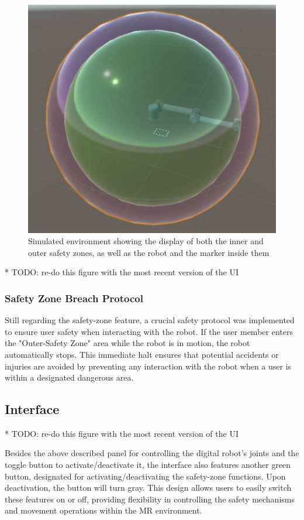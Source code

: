 \begin{figure}[h]
\centering
\includegraphics[width=0.5\linewidth]{figs/dual-safetyzone-robot.png}
\caption{Simulated environment showing the display of both the inner and outer safety zones, as well as the robot and the marker inside them}
\label{fig:dual-safety}
\end{figure}
* TODO: re-do this figure with the most recent version of the UI

\subsubsection{Safety Zone Breach Protocol}
Still regarding the safety-zone feature, a crucial safety protocol was implemented to ensure user safety when interacting with the robot. If the user member enters the "Outer-Safety Zone" area while the robot is in motion, the robot automatically stops. This immediate halt ensures that potential accidents or injuries are avoided by preventing any interaction with the robot when a user is within a designated dangerous area.
    
\subsection{Interface}

* TODO: re-do this figure with the most recent version of the UI

Besides the above described panel for controlling the digital robot's joints and the toggle button to activate/deactivate it, the interface also features another green button, designated for activating/deactivating the safety-zone functions. Upon deactivation, the button will turn gray. This design allows users to easily switch these features on or off, providing flexibility in controlling the safety mechanisms and movement operations within the \ac{MR} environment.

